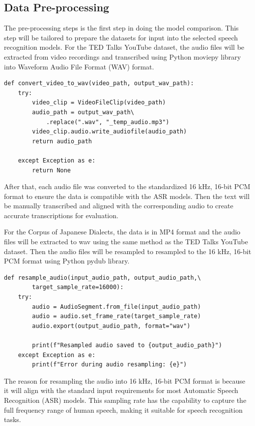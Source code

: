 \subsection{Data Pre-processing}
The pre-processing steps is the first step in doing the model comparison. This step will be tailored to prepare the datasets for input into the selected speech recognition models. For the TED Talks YouTube dataset, the audio files will be  extracted from video recordings and transcribed using Python moviepy library into Waveform Audio File Format (WAV) format. 
\begin{lstlisting}[caption={Python code to convert video to WAV format using moviepy}]
    def convert_video_to_wav(video_path, output_wav_path):
    try:
        video_clip = VideoFileClip(video_path)
        audio_path = output_wav_path\
            .replace(".wav", "_temp_audio.mp3")
        video_clip.audio.write_audiofile(audio_path)
        return audio_path
    
    except Exception as e:
        return None
\end{lstlisting}
After that, each audio file was converted to the standardized 16 kHz, 16-bit PCM format to ensure the data is compatible with the ASR models. Then the text will be manually transcribed and aligned with the corresponding audio to create accurate transcriptions for evaluation.

For the Corpus of Japanese Dialects, the data is in MP4 format and the audio files will be extracted to wav using the same method as the TED Talks YouTube dataset. Then the audio files will be resampled to resampled to the 16 kHz, 16-bit PCM format using Python pydub library.

\begin{lstlisting}[caption={Python code to resample audio to 16 kHz using pydub}]
    def resample_audio(input_audio_path, output_audio_path,\
        target_sample_rate=16000):
    try:
        audio = AudioSegment.from_file(input_audio_path)
        audio = audio.set_frame_rate(target_sample_rate)
        audio.export(output_audio_path, format="wav")
        
        print(f"Resampled audio saved to {output_audio_path}")
    except Exception as e:
        print(f"Error during audio resampling: {e}")
\end{lstlisting}
The reason for resampling the audio into 16 kHz, 16-bit PCM format is because it will align with the standard input requirements for most Automatic Speech Recognition (ASR) models. This sampling rate has the capability to capture the full frequency range of human speech, making it suitable for speech recognition tasks.


